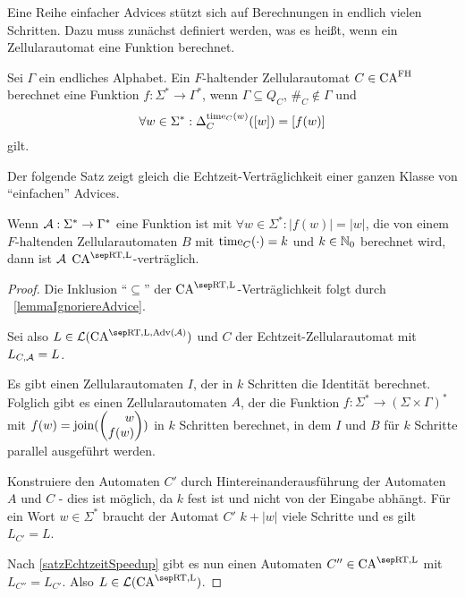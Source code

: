 Eine Reihe einfacher Advices stützt sich auf Berechnungen in endlich vielen Schritten.
Dazu muss zunächst definiert werden, was es heißt, wenn ein Zellularautomat eine Funktion berechnet.
\begin{definition}
    Sei $\Gamma$ ein endliches Alphabet.
    Ein $F$-haltender Zellularautomat $C \in \textrm{CA}^{\textrm{FH}}$ berechnet eine Funktion $f: \Sigma^* \to \Gamma^*$, wenn
    $\Gamma \subseteq Q_C$, $\#_C \not\in \Gamma$ und 
    \[
        \forall w \in \Sigma^*: \Delta^{\operatorname{time}_C(w)}_{C}([w]) = [f(w)]
    \]
    gilt.
\end{definition}

Der folgende Satz zeigt gleich die Echtzeit-Verträglichkeit einer ganzen Klasse von \enquote{einfachen} Advices.
\begin{satz}
    \label{lemmaEinfachesOrakel}
    Wenn $\mathcal{A}: \Sigma^* \to \Gamma^*$ eine Funktion ist mit $\forall w \in \Sigma^*: |f(w)| = |w|$,
    die von einem $F$-haltenden Zellularautomaten $B$ mit
    $\operatorname{time}_C(\cdot) = k$ und $k \in \mathbb{N}_0$ berechnet wird,
    dann ist $\mathcal{A}$ $\CAM{\CART, \CALeft}$-verträglich.
\end{satz}
\begin{proof}
    Die Inklusion \enquote{$\subseteq$} der $\CAM{\CART, \CALeft}$-Verträglichkeit folgt durch ~\cref{lemmaIgnoriereAdvice}.
    
    Sei also $L \in \CAL{\CART, \CALeft, \orakel({\advA})}$ und $C$
    der Echtzeit-Zellularautomat mit $L_{C, \mathcal{A}} = L$.
    
    Es gibt einen Zellularautomaten $I$, der in $k$ Schritten die Identität berechnet. Folglich gibt es einen Zellularautomaten $A$, der die Funktion $f: \Sigma^* \to (\Sigma \times \Gamma)^*$ mit
    $f(w) = \joinw(\Spvek{w; f(w)})$ in $k$ Schritten berechnet, in dem $I$ und $B$ für $k$ Schritte parallel ausgeführt werden.
    
    Konstruiere den Automaten $C'$ durch Hintereinanderausführung der Automaten $A$ und $C$ - dies ist möglich, da $k$ fest ist und nicht von der Eingabe abhängt.
    Für ein Wort $w \in \Sigma^*$ braucht der Automat $C'$ $k + |w|$ viele Schritte und es gilt $L_{C'} = L$.
    
    Nach \cref{satzEchtzeitSpeedup} gibt es nun einen Automaten $C'' \in \CAM{\CART, \CALeft}$
    mit $L_{C''} = L_{C'}$.
    Also $L \in \CAL{\CART, \CALeft}$.
\end{proof}

